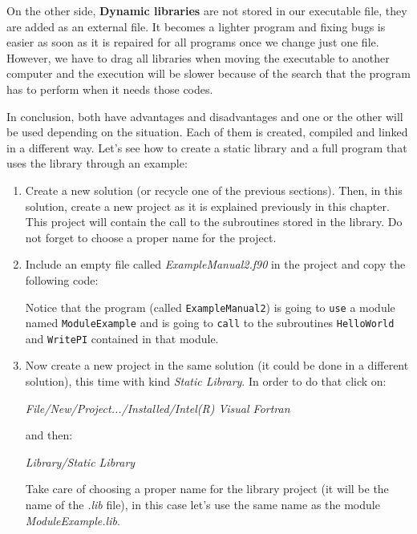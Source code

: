 \begin{enumerate}
	On the other side, \textbf{Dynamic libraries} are not stored in our executable file, they are added as an external file. It becomes a lighter program and fixing bugs is easier as soon as it is repaired for all programs once we change just one file. However, we have to drag all libraries when moving the executable to another computer and the execution will be slower because of the search that the program has to perform when it needs those codes. 
    
    In conclusion, both have advantages and disadvantages and one or the other will be used depending on the situation. Each of them is created, compiled and linked in a different way. Let's see how to create a static library and a full program that uses the library through an example:
	
	\begin{enumerate}
        
		\item Create a new solution (or recycle one of the previous sections). Then, in this solution, create a new project as it is explained previously in this chapter. This project will contain the call to the subroutines stored in the library. Do not forget to choose a proper name for the project.
        
		\item Include an empty file called \textit{ExampleManual2.f90} in the project and copy the following code:
	    
        \vspace{0.5cm}
		
        
        Notice that the program (called \verb|ExampleManual2|) is going to \verb|use| a module named \verb|ModuleExample| and is going to \verb|call| to the subroutines \verb|HelloWorld| and \verb|WritePI| contained in that module. 
		
		\item Now create a new project in the same solution (it could be done in a different solution), this time with kind \textit{Static Library}. In order to do that click on:
        
        \textit{File/New/Project.../Installed/Intel(R) Visual Fortran}
        
        and then: 
        
        \textit{Library/Static Library}
        
        Take care of choosing a proper name for the library project (it will be the name of the \textit{.lib} file), in this case let's use the same name as the module \textit{ModuleExample.lib}.
        

\end{enumerate}
\end{enumerate}
